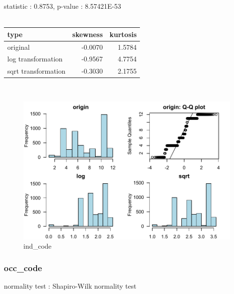 \documentclass{book}\usepackage[]{graphicx}\usepackage[]{color}
\begin{document}
\noindent statistic : 0.8753,  p-value : 8.57421E-53\\
\\%
\begin{tabular}{lrr}
  \toprule
type & skewness & kurtosis \\ 
  \midrule
original & -0.0070 & 1.5784 \\ 
  log transformation & -0.9567 & 4.7754 \\ 
  sqrt transformation & -0.3030 & 2.1755 \\ 
   \bottomrule
\end{tabular}
\\
\begin{figure}[!ht]
\centering
\includegraphics[width=1.0\textwidth]{figure/norm13.pdf}
\caption{ind\_code}
\end{figure}
\clearpage
\subsubsection{ occ\_code }

normality test : Shapiro-Wilk normality test
\end{document}
